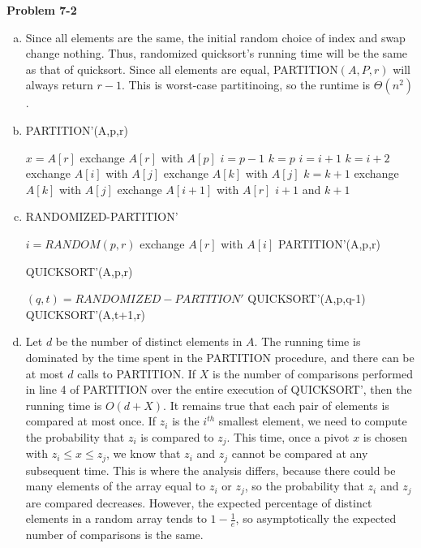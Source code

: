 \documentclass{article}
\begin{document}
\noindent\textbf{Problem 7-2}\\
\begin{enumerate}[a.]
\item  Since all elements are the same, the initial random choice of index and swap change nothing.  Thus, randomized quicksort's running time will be the same as that of quicksort.  Since all elements are equal, PARTITION$(A,P,r)$ will always return $r-1$.  This is worst-case partitinoing, so the runtime is $\Theta(n^2)$. \\

\item
\begin{algorithm}
\caption{PARTITION'(A,p,r)}
\begin{algorithmic}[1]
\State $x = A[r]$
\State exchange $A[r]$ with $A[p]$
\State $i=p-1$
\State $k = p$
		\State $i=i+1$
		\State $k = i+2$
		\State exchange $A[i]$ with $A[j]$
		\State exchange $A[k]$ with $A[j]$
	\EndIf
		\State $k = k+1$
		\State exchange $A[k]$ with $A[j]$
	\EndIf
\EndFor
\State exchange $A[i+1]$ with $A[r]$
\State \Return $i+1$ and $k+1$
\end{algorithmic}
\end{algorithm}

\item
\begin{algorithm}
\caption{RANDOMIZED-PARTITION'}
\begin{algorithmic}[1]
\State $i=RANDOM(p,r)$
\State exchange $A[r]$ with $A[i]$
\State \Return PARTITION'(A,p,r)
\end{algorithmic}
\end{algorithm}

\begin{algorithm}
\caption{QUICKSORT'(A,p,r)}
\begin{algorithmic}[1]
	\State $(q,t) = RANDOMIZED-PARTITION'$
	\State QUICKSORT'(A,p,q-1)
	\State QUICKSORT'(A,t+1,r)
\EndIf
\end{algorithmic}
\end{algorithm}

\item Let $d$ be the number of distinct elements in $A$.  The running time is dominated by the time spent in the PARTITION procedure, and there can be at most $d$ calls to PARTITION.  If $X$ is the number of comparisons performed in line 4 of PARTITION over the entire execution of QUICKSORT', then the running time is $O(d+X)$. It remains true that each pair of elements is compared at most once. If $z_i$ is the $i^{th}$ smallest element, we need to compute the probability that $z_i$ is compared to $z_j$. This time, once a pivot $x$ is chosen with $z_i \leq x \leq z_j$, we know that $z_i$ and $z_j$ cannot be compared at any subsequent time. This is where the analysis differs, because there could be many elements of the array equal to $z_i$ or $z_j$, so the probability that $z_i$ and $z_j$ are compared decreases. However, the expected percentage of distinct elements in a random array tends to $1-\frac{1}{e}$, so asymptotically the expected number of comparisons is the same. 
\end{enumerate}
\end{document}

